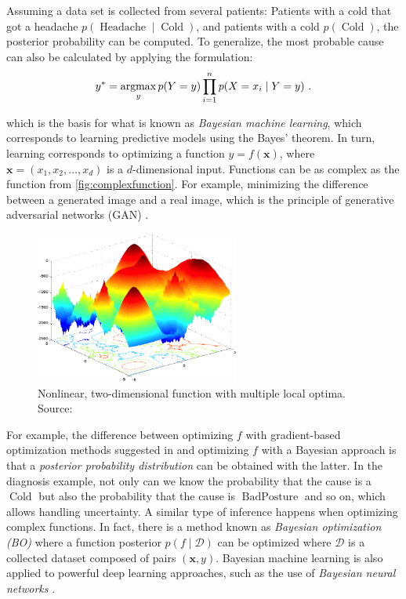 

Assuming a data set is collected from several patients: Patients with a cold that got a headache $p(\operatorname{Headache} \mid \operatorname{Cold})$, and patients with a cold $p(\operatorname{Cold})$, the posterior probability can be computed. To generalize, the most probable cause can also be calculated by applying the formulation:
\begin{align}
y^* = \operatorname*{argmax}_{y} p(Y=y)\prod_{i=1}^n p(X=x_i\mid Y=y)~.
\end{align}

which is the basis for what is known as \textit{Bayesian machine learning}, which corresponds to learning predictive models using the Bayes' theorem. In turn, learning corresponds to optimizing a function $y = f(\mathbf{x})$, where $\mathbf{x} = (x_1, x_2, \ldots, x_d)$ is a $d$-dimensional input. Functions can be as complex as the function from \autoref{fig:complexfunction}. For example, minimizing the difference between a generated image and a real image, which is the principle of generative adversarial networks (GAN) \parencite{gonog2019review}.

\begin{figure}[h]
    \centering
    \includegraphics[width=0.6\textwidth]{figures/complexfunction.png}
    \caption{Nonlinear, two-dimensional function with multiple local optima. Source: \parencite{li2013benchmark}}
    \label{fig:complexfunction}
\end{figure}

For example, the difference between optimizing $f$ with gradient-based optimization methods suggested in \textcite{bengio2000gradient} and optimizing $f$ with a Bayesian approach is that a \textit{posterior probability distribution} can be obtained with the latter. In the diagnosis example, not only can we know the probability that the cause is a $\operatorname{Cold}$ but also the probability that the cause is $\operatorname{BadPosture}$ and so on, which allows handling uncertainty. A similar type of inference happens when optimizing complex functions. In fact, there is a method known as \textit{Bayesian optimization (BO)} \parencite{shahriari2015taking} where a function posterior $p(f \mid \mathcal{D})$ can be optimized where $\mathcal{D}$ is a collected dataset composed of pairs $(\mathbf{x}, y)$. Bayesian machine learning is also applied to powerful deep learning approaches, such as the use of \textit{Bayesian neural networks} \parencite{jospin2022hands}. 

